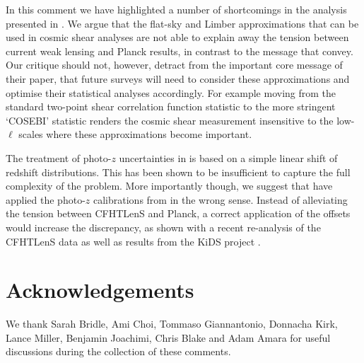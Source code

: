 In this comment we have highlighted a number of shortcomings in the analysis presented in \cite{kitching/etal:2016}.  We argue that the flat-sky and Limber approximations that can be used in cosmic shear analyses are not able to explain away the tension between current weak lensing and Planck results, in contrast to the message that \cite{kitching/etal:2016} convey.  Our critique should not, however, detract from the important core message of their paper, that future surveys will need to consider these approximations and optimise their statistical analyses accordingly.  For example moving from the standard two-point shear correlation function statistic to the more stringent `COSEBI' statistic \citep{schneider/etal:2010} renders the cosmic shear measurement insensitive to the low-$\ell$ scales where these approximations become important.  

The treatment of photo-$z$ uncertainties in \cite{kitching/etal:2016} is based on a simple linear shift of redshift distributions. This has been shown to be insufficient to capture the full complexity of the problem.  More importantly though, we suggest that \cite{kitching/etal:2016} have applied the photo-$z$ calibrations from \cite{choi/etal:2016} in the wrong sense. Instead of alleviating the tension between CFHTLenS and Planck, a correct application of the offsets would increase the discrepancy, as shown with a recent re-analysis of the CFHTLenS data \citep{joudaki/etal:2016} as well as results from the KiDS project \citep{hildebrandt/etal:2016}.

\section{Acknowledgements}
We thank Sarah Bridle, Ami Choi, Tommaso Giannantonio, Donnacha Kirk, Lance Miller, Benjamin Joachimi, Chris Blake and Adam Amara for useful discussions during the collection of these comments.